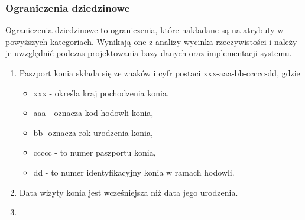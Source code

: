 \documentclass[12pt,twoside]{report}
\begin{document}
\subsubsection{Ograniczenia dziedzinowe}
Ograniczenia dziedzinowe to ograniczenia, które nakładane są na atrybuty w powyższych kategoriach. Wynikają one z analizy wycinka rzeczywistości i należy je uwzględnić podczas projektowania bazy danych oraz implementacji systemu.
\begin{enumerate}[start=1,label={\bfseries OGR\textbackslash 00\arabic*}]
	\item Paszport konia składa się ze znaków i cyfr postaci xxx-aaa-bb-ccccc-dd, gdzie
	\begin{itemize} 
		\item xxx - określa kraj pochodzenia konia,  
		\item aaa - oznacza kod hodowli konia, 
		\item bb- oznacza rok urodzenia konia, 
		\item ccccc - to numer paszportu konia, 
		\item dd - to numer identyfikacyjny konia w ramach hodowli.
		\end{itemize}
	\item Data wizyty konia jest wcześniejsza niż data jego urodzenia.
	\item 
\end{enumerate}
\end{document}

